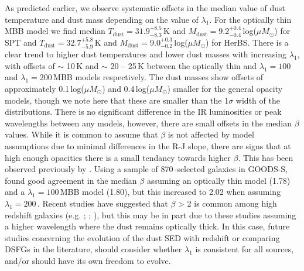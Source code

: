 As predicted earlier, we observe systematic offsets in the median value of dust temperature and dust mass depending on the value of $\lambda_1$. For the optically thin MBB model we find median $T_{\textrm{dust}} = 31.9_{-8.3}^{+8.5}$\,K and $M_{\textrm{dust}} = 9.2_{-0.4}^{+0.4}$\,log($\mu M_\odot$) for SPT and $T_{\textrm{dust}} = 32.7_{-5.9}^{+5.8}$\,K and $M_{\textrm{dust}} = 9.0_{-0.2}^{+0.3}$\,log($\mu M_\odot$) for HerBS. There is a clear trend to higher dust temperatures and lower dust masses with increasing $\lambda_1$, with offsets of $\sim$ 10\,K and $\sim$ 20 -- 25\,K between the optically thin and $\lambda_1 = 100$\,\micron and $\lambda_1 = 200$\,\micron MBB models respectively. The dust masses show offsets of approximately 0.1\,log($\mu M_\odot$) and 0.4\,log($\mu M_\odot$) smaller for the general opacity models, though we note here that these are smaller than the 1$\sigma$ width of the distributions. There is no significant difference in the IR luminosities or peak wavelengths between any models, however, there are small offsets in the median $\beta$ values. While it is common to assume that $\beta$ is not affected by model assumptions due to minimal differences in the R-J slope, there are signs that at high enough opacities there is a small tendancy towards higher $\beta$. This has been observed previously by \citealt{McKay_2023}. Using a sample of 870\,\micron-selected galaxies in GOODS-S, \citealt{McKay_2023} found good agreement in the median $\beta$ assuming an optically thin model (1.78) and a $\lambda_1 = 100$\,\micron MBB model (1.80), but this increased to 2.02 when assuming $\lambda_1 = 200$\,\micron. Recent studies have suggested that $\beta$ > 2 is common among high redshift galaxies (e.g. \citealt{Casey_2019}; \citealt{Casey_2021}; \citealt{Cooper_2022}), but this may be in part due to these studies assuming a higher wavelength where the dust remains optically thick. In this case, future studies concerning the evolution of the dust SED with redshift or comparing DSFGs in the literature, should consider whether $\lambda_1$ is consistent for all sources, and/or should have its own freedom to evolve.

